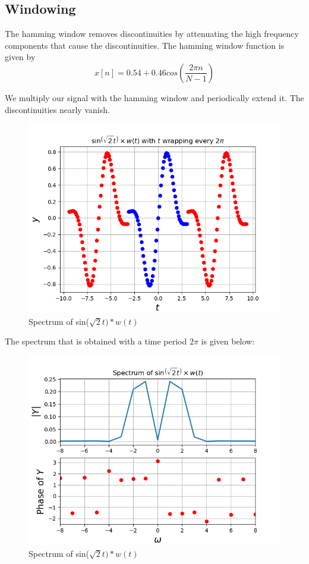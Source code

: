 \documentclass[11pt, a4paper]{article}
\begin{document}
\subsection{Windowing}
The hamming window removes discontinuities by attenuating the high frequency components that cause the discontinuities.
The hamming window function is given by
\begin{equation}
    x[n] = 0.54 + 0.46cos(\frac{2\pi n}{N-1})
\end{equation}

We multiply our signal with the hamming window and periodically extend it. The discontinuities nearly vanish.
\begin{figure}[h!]
\centering
\includegraphics[scale=0.6]{fig4.png}
\caption{Spectrum of sin($\sqrt{2}t)*w(t)$}
\label{fig:universe}
\end{figure}
\clearpage
The spectrum that is obtained with a time period $2\pi$ is given below:
\begin{figure}[h!]
\centering
\includegraphics[scale=0.6]{fig5.png}
\caption{Spectrum of sin($\sqrt{2}t)*w(t)$}
\label{fig:universe}
\end{figure}
\end{document}
